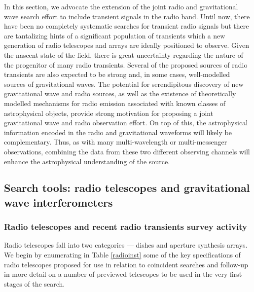 In this section, we advocate the extension of the joint radio and
gravitational wave search effort to include transient signals in the
radio band.  Until now, there have been no completely systematic searches for transient radio
signals but there are tantalizing hints of a significant population of transients
\cite{Lazio:2009xe} which a new generation of radio telescopes and
arrays are ideally positioned to observe.  Given the nascent state of
the field, there is great uncertainty regarding the nature of the progenitor of 
many radio transients. Several of the proposed sources of radio transients are
also expected to be strong and, in some cases, well-modelled sources of 
gravitational waves.  The potential for serendipitous discovery
of new gravitational wave and radio sources, as well as the existence of 
theoretically modelled mechanisms for radio emission associated with known classes of
astrophysical objects, provide strong motivation for proposing a joint
gravitational wave and radio observation effort. On top of this, the astrophysical 
information encoded in the radio and gravitational waveforms will likely be complementary.
Thus, as with many multi-wavelength or multi-messenger observations,
combining the data from these two different observing channels will
enhance the astrophysical understanding of the source.

\subsection{Search tools: radio telescopes and gravitational wave interferometers}
\label{sec:telescopes}

\subsubsection{Radio telescopes and recent radio transients survey activity}

Radio telescopes fall into two categories --- dishes and aperture
synthesis arrays. We begin by enumerating in Table \ref{radioinst}
some of the key specifications of radio telescopes proposed for use in
relation to coincident searches and follow-up in more detail on
a number of previewed telescopes to be used in the very first stages of
the search.

